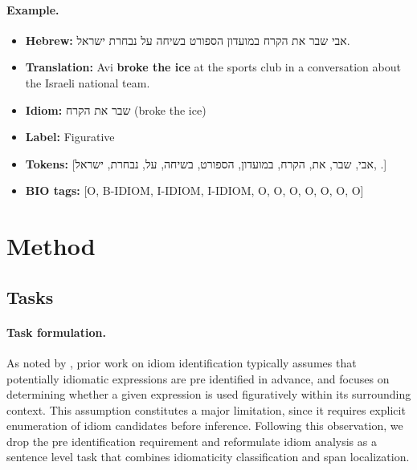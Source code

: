 \documentclass[11pt]{article}
\begin{document}
\paragraph{Example.}
\begin{itemize}[noitemsep,topsep=0pt]
    \item \textbf{Hebrew:} \foreignlanguage{hebrew}{אבי שבר את הקרח במועדון הספורט בשיחה על נבחרת ישראל.}
    \item \textbf{Translation:} Avi \textbf{broke the ice} at the sports club in a conversation about the Israeli national team.
    \item \textbf{Idiom:} \foreignlanguage{hebrew}{שבר את הקרח} (broke the ice)
    \item \textbf{Label:} Figurative
    \item \textbf{Tokens:} [\foreignlanguage{hebrew}{אבי}, \foreignlanguage{hebrew}{שבר}, \foreignlanguage{hebrew}{את}, \foreignlanguage{hebrew}{הקרח}, \foreignlanguage{hebrew}{במועדון}, \foreignlanguage{hebrew}{הספורט}, \foreignlanguage{hebrew}{בשיחה}, \foreignlanguage{hebrew}{על}, \foreignlanguage{hebrew}{נבחרת}, \foreignlanguage{hebrew}{ישראל}, .]
    \item \textbf{BIO tags:} [O, B-IDIOM, I-IDIOM, I-IDIOM, O, O, O, O, O, O, O]
\end{itemize}

\section{Method}

\subsection{Tasks}

\paragraph{Task formulation.}
As noted by \citet{tedeschi-etal-2022-id10m}, prior work on idiom identification typically assumes that potentially idiomatic expressions are pre identified in advance, and focuses on determining whether a given expression is used figuratively within its surrounding context. This assumption constitutes a major limitation, since it requires explicit enumeration of idiom candidates before inference. Following this observation, we drop the pre identification requirement and reformulate idiom analysis as a sentence level task that combines idiomaticity classification and span localization.
\end{document}

